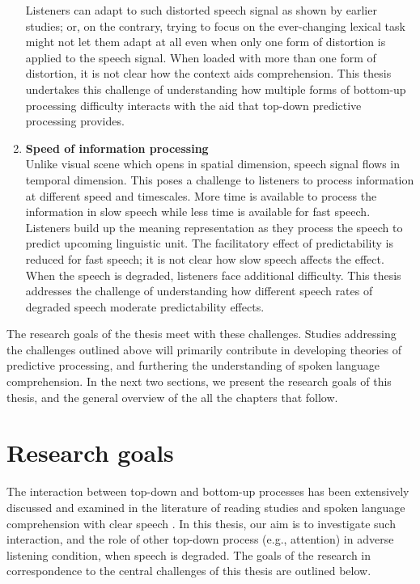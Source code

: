 \documentclass[a4paper, nobind]{templates/ociamthesis}
\begin{document}
\begin{enumerate}
  Listeners can adapt to such distorted speech signal as shown by earlier studies;
  or, on the contrary, trying to focus on the ever-changing lexical task might not let them adapt at all even when only one form of distortion is applied to the speech signal.
  When loaded with more than one form of distortion, it is not clear how the context aids comprehension.
  This thesis undertakes this challenge of understanding how multiple forms of bottom-up processing difficulty interacts with the aid that top-down predictive processing provides.
\item
  \textbf{Speed of information processing}\\
  Unlike visual scene which opens in spatial dimension, speech signal flows in temporal dimension.
  This poses a challenge to listeners to process information at different speed and timescales.
  More time is available to process the information in slow speech while less time is available for fast speech.
  Listeners build up the meaning representation as they process the speech to predict upcoming linguistic unit.
  The facilitatory effect of predictability is reduced for fast speech; it is not clear how slow speech affects the effect.
  When the speech is degraded, listeners face additional difficulty.
  This thesis addresses the challenge of understanding how different speech rates of degraded speech moderate predictability effects.
\end{enumerate}

The research goals of the thesis meet with these challenges.
Studies addressing the challenges outlined above will primarily contribute in developing theories of predictive processing, and furthering the understanding of spoken language comprehension.
In the next two sections, we present the research goals of this thesis, and the general overview of the all the chapters that follow.

\hypertarget{research-goals}{%
\section{Research goals}\label{research-goals}}

The interaction between top-down and bottom-up processes has been extensively discussed and examined in the literature of reading studies and spoken language comprehension with clear speech \autocites[for reviews,][]{Staub2015,Kuperberg2016,Pickering2018}.
In this thesis, our aim is to investigate such interaction, and the role of other top-down process (e.g., attention) in adverse listening condition, when speech is degraded.
The goals of the research in correspondence to the central challenges of this thesis are outlined below.
\end{document}
